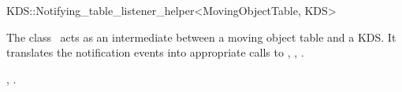 

\begin{ccRefClass}{KDS::Notifying_table_listener_helper<MovingObjectTable, KDS>}  %


\ccDefinition
  
The class \ccRefName\ acts as an intermediate between a moving object
table and a KDS. It translates the
 notification events into
appropriate calls to , ,
.



\ccSeeAlso

,
.


\end{ccRefClass}


